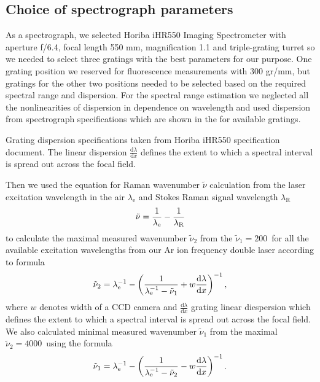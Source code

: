 \subsection{Choice of spectrograph parameters}

As a spectrograph, we selected Horiba iHR550 Imaging Spectrometer with aperture
f/6.4, focal length 550 mm, magnification 1.1 and triple-grating turret so we
needed to select three gratings with the best parameters for our purpose. One
grating position we reserved for fluorescence measurements with 300 gr/mm, but
gratings for the other two positions needed to be selected based on the
required spectral range and dispersion. For the spectral range estimation
we neglected all the nonlinearities of dispersion in dependence on wavelength
and used dispersion from spectrograph specifications which are shown in the
for available gratings.


\begin{table}
	\centering
	
	\caption{Grating dispersion specifications taken from Horiba iHR550
		specification document. The linear dispersion
		$\frac{\text{d}\lambda}{\text{d}x}$ defines the extent to which a spectral
		interval is spread out across the focal field.}
	\label{\tablabel{spectrograph_selection:dispersion_spec}}
\end{table}


Then we used the equation for Raman wavenumber $\tilde{\nu}$ calculation from
the laser excitation wavelength in the air $\lambda_\text{e}$ and Stokes Raman
signal wavelength $\lambda_\text{R}$
\begin{equation}
	\tilde{\nu} = \frac{1}{\lambda_\text{e}} - \frac{1}{\lambda_\text{R}}
	\label{\eqnlabel{spectrograph_selection:nu}}
\end{equation}
to calculate the maximal measured wavenumber $\tilde{\nu}_2$ from the
$\tilde{\nu}_1 = 200$\,\icm{} for all the available excitation wavelengths
from our Ar ion frequency double laser according to formula
\begin{equation}
	\tilde{\nu}_2 = \lambda_\text{e}^{-1}
		- \left(\frac{1}{\lambda_\text{e}^{-1} - \tilde{\nu}_1}
			+ w\frac{\text{d}\lambda}{\text{d}x}\right)^{-1},
	\label{\eqnlabel{spectrograph_selection:spectral_range_max_est}}
\end{equation}
where $w$ denotes width of a CCD camera and $\frac{\text{d}\lambda}{\text{d}x}$
grating linear diespersion which defines the extent to which a spectral
interval is spread out across the focal field. We also calculated minimal
measured wavenumber $\tilde{\nu}_1$ from the maximal
$\tilde{\nu}_2 = 4000$\,\icm{} using the formula
\begin{equation}
	\tilde{\nu}_1 = \lambda_\text{e}^{-1}
		- \left(\frac{1}{\lambda_\text{e}^{-1} - \tilde{\nu}_2}
			- w\frac{\text{d}\lambda}{\text{d}x}\right)^{-1}.
	\label{\eqnlabel{spectrograph_selection:spectral_range_min_est}}
\end{equation}

